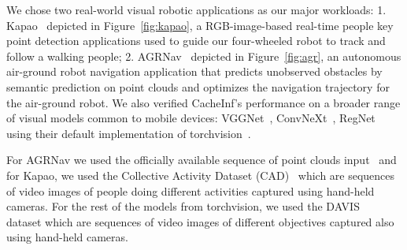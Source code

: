 
We chose two real-world visual robotic applications as our major workloads: 1. Kapao~\cite{kapao} depicted in Figure~\ref{fig:kapao}, a RGB-image-based real-time people key point detection applications used to guide our four-wheeled robot to track and follow a walking people;
2. AGRNav~\cite{agrnav} depicted in Figure~\ref{fig:agr}, an autonomous air-ground robot navigation application that predicts unobserved obstacles by semantic prediction on point clouds and optimizes the navigation trajectory for the air-ground robot.
We also verified CacheInf's performance on a broader range of visual models common to mobile devices: VGGNet~\cite{simonyan2015deep}, ConvNeXt~\cite{woo2023convnext}, RegNet~\cite{xu2022regnet} using their default implementation of torchvision~\cite{noauthor_torchvision_nodate}. 

For AGRNav we used the officially available sequence of point clouds input~\cite{agrnav} and for Kapao, we used the Collective Activity Dataset (CAD)~\cite{Choi_VSWS_2009} which are sequences of video images of people doing different activities captured using hand-held cameras.
For the rest of the models from torchvision, we used the DAVIS~\cite{Perazzi2016} dataset which are sequences of video images of different objectives captured also using hand-held cameras.

